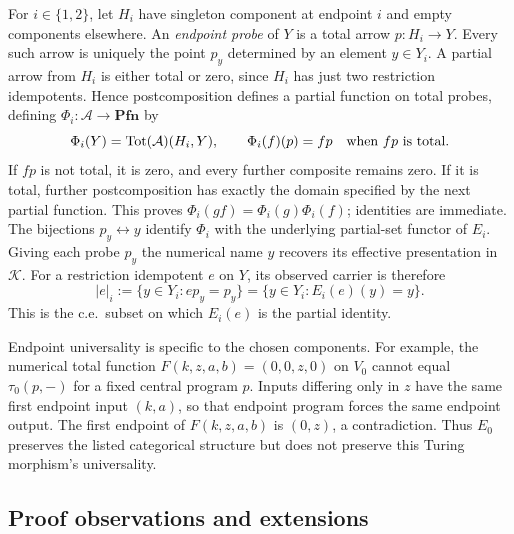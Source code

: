 \documentclass[11pt]{article}
\newcommand{\Pfn}{\mathbf{Pfn}}
\begin{document}
For $i\in\{1,2\}$, let $H_i$ have singleton component at endpoint $i$ and empty
components elsewhere. An \emph{endpoint probe} of $Y$ is a total
arrow $p:H_i\to Y$. Every such arrow is uniquely
the point $p_y$ determined by an element $y\in Y_i$. A partial
arrow from $H_i$ is either total or zero, since $H_i$ has just
two restriction idempotents. Hence postcomposition defines a partial
function on total probes, defining $\Phi_i:\mathcal A\to\Pfn$ by
\[
 \Phi_i(Y)=\operatorname{Tot}(\mathcal A)(H_i,Y),\qquad
 \Phi_i(f)(p)=fp\quad\hbox{when }fp\hbox{ is total}.
\]
If $fp$ is not total, it is zero, and every further composite
remains zero. If it is total, further postcomposition has exactly
the domain specified by the next partial function. This proves
$\Phi_i(gf)=\Phi_i(g)\Phi_i(f)$; identities are immediate.
The bijections $p_y\leftrightarrow y$ identify $\Phi_i$ with the
underlying partial-set functor of $E_i$. Giving each probe $p_y$
the numerical name $y$ recovers its effective presentation in
$\mathcal K$.
For a restriction idempotent $e$ on $Y$, its observed carrier is therefore
\begin{equation}\label{eq:probe-domain}
 |e|_i:=\{y\in Y_i:ep_y=p_y\}
       =\{y\in Y_i:E_i(e)(y)=y\}.
\end{equation}
This is the c.e.\ subset on which $E_i(e)$ is the partial identity.

Endpoint universality is specific to the chosen components.
For example, the numerical total function
$F(k,z,a,b)=(0,0,z,0)$ on $V_0$ cannot equal
$\tau_0(p,-)$ for a fixed central program $p$.
Inputs differing only in $z$ have the same first endpoint input
$(k,a)$, so that endpoint program forces the same endpoint output.
The first endpoint of $F(k,z,a,b)$ is $(0,z)$, a contradiction.
Thus $E_0$ preserves the listed categorical structure but does
not preserve this Turing morphism's universality.

\subsection{Proof observations and extensions}
\end{document}
